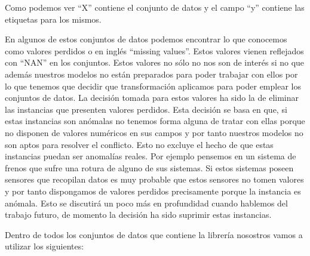 Como podemos ver ``X'' contiene el conjunto de datos y el campo ``y'' contiene las etiquetas para los mismos.

En algunos de estos conjuntos de datos podemos encontrar lo que conocemos como valores perdidos o en inglés ``missing values''. Estos valores vienen reflejados con ``NAN'' en los conjuntos. Estos valores no sólo no nos son de interés si no que además nuestros modelos no están preparados para poder trabajar con ellos por lo que tenemos que decidir que transformación aplicamos para poder emplear los conjuntos de datos. La decisión tomada para estos valores ha sido la de eliminar las instancias que presenten valores perdidos. Esta decisión se basa en que, si estas instancias son anómalas no tenemos forma alguna de tratar con ellas porque no disponen de valores numéricos en sus campos y por tanto nuestros modelos no son aptos para resolver el conflicto. Esto no excluye el hecho de que estas instancias puedan ser anomalías reales. Por ejemplo pensemos en un sistema de frenos que sufre una rotura de alguno de sus sistemas. Si estos sistemas poseen sensores que recopilan datos es muy probable que estos sensores no tomen valores y por tanto dispongamos de valores perdidos precisamente porque la instancia es anómala. Esto se discutirá un poco más en profundidad cuando hablemos del trabajo futuro, de momento la decisión ha sido suprimir estas instancias.

Dentro de todos los conjuntos de datos que contiene la librería nosostros vamos a utilizar los siguientes:

